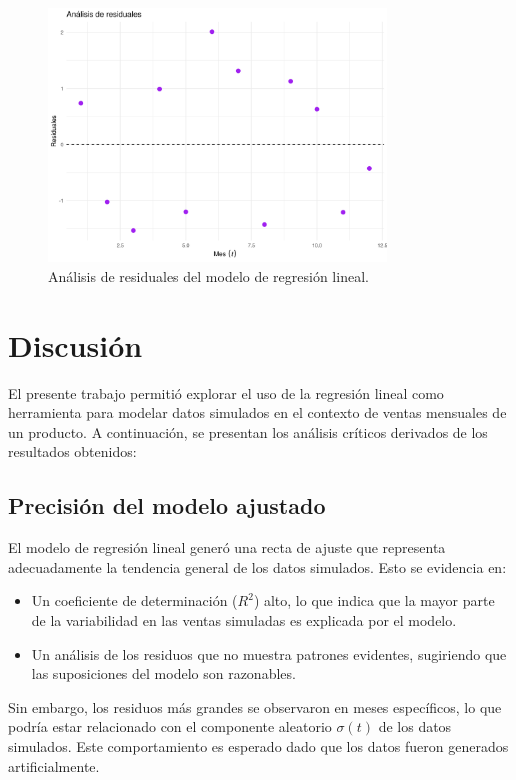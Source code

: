 \documentclass[a4paper,12pt]{article}
\begin{document}
\begin{figure}[H]
    \centering
    \includegraphics[width=0.8\textwidth]{residuales_regresion.png}
    \caption{Análisis de residuales del modelo de regresión lineal.}
    \label{fig:residuales}
\end{figure}

\section{Discusión}

El presente trabajo permitió explorar el uso de la regresión lineal como herramienta para modelar datos simulados en el contexto de ventas mensuales de un producto. A continuación, se presentan los análisis críticos derivados de los resultados obtenidos:

\subsection{Precisión del modelo ajustado}

El modelo de regresión lineal generó una recta de ajuste que representa adecuadamente la tendencia general de los datos simulados. Esto se evidencia en:
\begin{itemize}
    \item Un coeficiente de determinación (\( R^2 \)) alto, lo que indica que la mayor parte de la variabilidad en las ventas simuladas es explicada por el modelo.
    \item Un análisis de los residuos que no muestra patrones evidentes, sugiriendo que las suposiciones del modelo son razonables.
\end{itemize}

Sin embargo, los residuos más grandes se observaron en meses específicos, lo que podría estar relacionado con el componente aleatorio \( \sigma(t) \) de los datos simulados. Este comportamiento es esperado dado que los datos fueron generados artificialmente.
\end{document}
